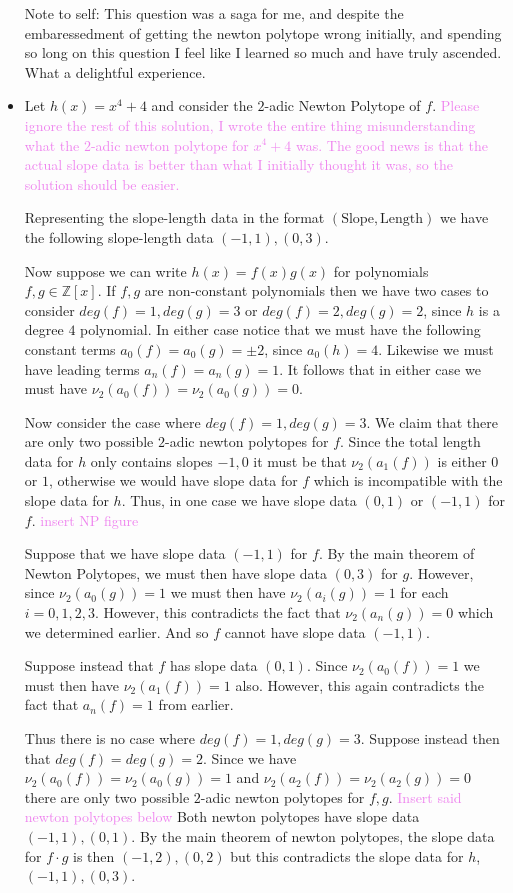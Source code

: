 \documentclass[12pt,letterpaper,boxed]{hmcpset}
\newcommand{\wg}[1]{\textcolor{violet}{#1}}
\newcommand{\Z}{\mathbb Z}
\begin{document}
\begin{solution}
\begin{itemize}
Note to self: 
This question was a saga for me, and despite the embaressedment of getting the newton
polytope wrong initially, and spending so long on this question
I feel like I learned so much and have truly
ascended. What a delightful experience.


\item Let $h(x) = x^4 + 4$ and consider the $2$-adic Newton Polytope
of $f$. 
\wg{Please ignore the rest of this solution, I wrote the entire thing
misunderstanding what the $2$-adic newton polytope for $x^4 + 4$ was.
The good news is that the actual slope data is better than what I
initially thought it was, so the solution should be easier.}


Representing the slope-length data in the format $(\text{Slope},
\text{Length})$ we have the following slope-length data $(-1, 1),
(0,3)$. 

Now suppose we can write $h(x) = f(x)g(x)$ for polynomials $f,g \in
\Z[x]$. If $f,g$ are non-constant polynomials then we have two cases
to consider $deg(f) = 1, deg(g) = 3$ or $deg(f) = 2, deg(g) = 2$,
since $h$ is a degree $4$ polynomial. In either case notice that we
must have the following constant terms $a_0(f) = a_0(g) = \pm 2$,
since $a_0(h) = 4$. Likewise we must have leading terms $a_n(f) =
a_n(g) = 1$. It follows that in either case we must have $\nu_2(a_0(f)) =
\nu_2(a_0(g)) = 0$. 

Now consider the case where $deg(f) = 1, deg(g) = 3$.
We claim that there are only two possible $2$-adic newton polytopes
for $f$. Since the total length data for $h$ only contains slopes
$-1,0$ it must be that $\nu_2(a_1(f))$ is either $0$ or $1$, otherwise
we would have slope data for $f$ which is incompatible with the slope
data for $h$.
Thus, in one case we have slope data $(0,1)$ or $(-1,1)$ for $f$. 
\wg{insert NP figure}

Suppose that we have slope data $(-1,1)$ for $f$. 
By the main theorem of Newton Polytopes, we must then have slope
data $(0,3)$ for $g$. However, since $\nu_2(a_0(g)) = 1$ we must then
have $\nu_2(a_i(g)) = 1$ for each $i=0,1,2,3$. However, this
contradicts the fact that $\nu_2(a_n(g)) = 0$ which we determined
earlier. And so $f$ cannot have slope data $(-1,1)$.

Suppose instead that $f$ has slope data $(0,1)$. Since $\nu_2(a_0(f))
= 1$ we must then have $\nu_2(a_1(f)) = 1$ also. However, this again
contradicts the fact that $a_n(f) = 1$ from earlier.

Thus there is no case where $deg(f) = 1, deg(g) = 3$. Suppose instead
then that $deg(f) = deg(g) = 2$. Since we have $\nu_2(a_0(f)) =
\nu_2(a_0(g)) = 1$ and $\nu_2(a_2(f)) = \nu_2(a_2(g)) = 0$ there are
only two possible $2$-adic newton polytopes for $f,g$.
\wg{Insert said newton polytopes below}
Both newton polytopes have slope data $(-1,1),(0,1)$. By the main
theorem of newton polytopes, the slope data for $f\cdot g$ is then 
$(-1, 2), (0,2)$ but this contradicts the slope data for $h$, $(-1,1),
(0,3)$.


\end{itemize}
\end{solution}
\end{document}
